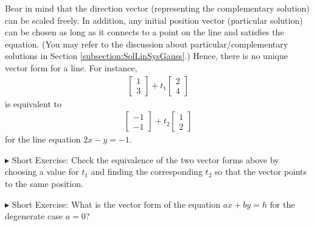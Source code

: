 Bear in mind that the direction vector (representing the complementary solution) can be scaled freely. In addition, any initial position vector (particular solution) can be chosen as long as it connects to a point on the line and satisfies the equation. (You may refer to the discussion about particular/complementary solutions in Section \ref{subsection:SolLinSysGauss}.) Hence, there is no unique vector form for a line. For instance,
\begin{align*}
\begin{bmatrix}
1\\
3
\end{bmatrix}
+ t_1
\begin{bmatrix}
2 \\
4
\end{bmatrix}     
\end{align*}
is equivalent to
\begin{align*}
\begin{bmatrix}
-1\\
-1
\end{bmatrix}
+ t_2
\begin{bmatrix}
1 \\
2
\end{bmatrix}     
\end{align*}
for the line equation $2x - y = -1$.\par
$\blacktriangleright$ Short Exercise: Check the equivalence of the two vector forms above by choosing a value for $t_1$ and finding the corresponding $t_2$ so that the vector points to the same position.\footnotemark\par
$\blacktriangleright$ Short Exercise: What is the vector form of the equation $ax + by = h$ for the degenerate case $a=0$?\footnotemark

